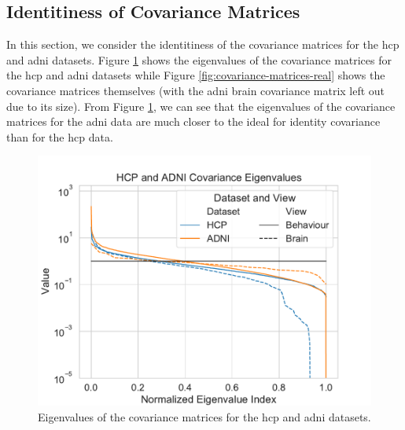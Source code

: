 \subsection{Identitiness of Covariance Matrices}
In this section, we consider the identitiness of the covariance matrices for the \acrshort{hcp} and \acrshort{adni} datasets.
Figure \ref{fig:covariance-eigenvalues-real} shows the eigenvalues of the covariance matrices for the \acrshort{hcp} and \acrshort{adni} datasets while Figure \ref{fig:covariance-matrices-real} shows the covariance matrices themselves (with the \acrshort{adni} brain covariance matrix left out due to its size).
From Figure \ref{fig:covariance-eigenvalues-real}, we can see that the eigenvalues of the covariance matrices for the \acrshort{adni} data are much closer to the ideal for identity covariance than for the \acrshort{hcp} data.
\begin{figure}
    \centering
    \includegraphics[width=0.8\linewidth]{figures/covariance/hcp_adni_covariance_eigenvalues}
    \caption{Eigenvalues of the covariance matrices for the \acrshort{hcp} and \acrshort{adni} datasets.}\label{fig:covariance-eigenvalues-real}
\end{figure}
%
%
